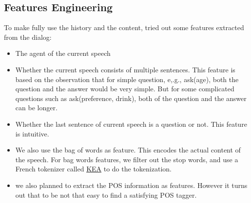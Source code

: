 \documentclass[a4paper]{article}
\begin{document}
\subsection{Features Engineering}
To make fully use the history and the content, tried out some features extracted from the dialog:
\begin{itemize}
    \item The agent of the current speech
    \item Whether the current speech consists of multiple sentences. This feature is based on the observation that for simple question, e,.g., ask(age), both the question and the answer would be very simple. But for some complicated questions such as ask(preference, drink), both of the question and the answer can be longer.
    \item Whether the last sentence of current speech is a question or not. This feature is intuitive.
    \item We also use the bag of words as feature. This encodes the actual content of the speech. For bag words features, we filter out the stop words, and use a French tokenizer called \href{https://github.com/boudinfl/kea}{KEA} to do the tokenization.
    \item we also planned to extract the POS information as features. However it turns out that to be not that easy to find a satisfying POS tagger.
\end{itemize}
\end{document}
